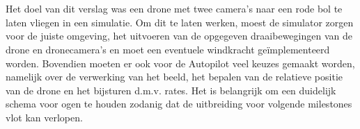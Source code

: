 \\
\\
Het doel van dit verslag was een drone met twee camera's naar een rode bol te laten vliegen in een simulatie. Om dit te laten werken, moest de simulator zorgen voor de juiste omgeving, het uitvoeren van de opgegeven draaibewegingen van de drone en dronecamera's en moet een eventuele windkracht ge\"implementeerd worden. 
Bovendien moeten er ook voor de Autopilot veel keuzes gemaakt worden, namelijk over de verwerking van het beeld, het bepalen van de relatieve positie van de drone en het bijsturen d.m.v. rates.
Het is belangrijk om een duidelijk schema voor ogen te houden zodanig dat de uitbreiding voor volgende milestones vlot kan verlopen.




